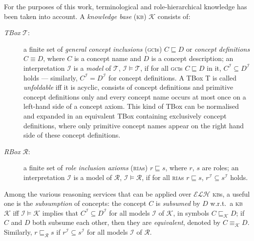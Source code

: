 \documentclass[]{llncs}
\newcommand{\elh}{\(\mathcal{ELH}{}\)}
\newcommand{\kb}{\textsc{kb}}
\newcommand{\ria}{\textsc{ria}}
\newcommand{\gci}{\textsc{gci}}
\newcommand{\subsume}[1]{\sqsubseteq_{\mathcal{#1}}}
\begin{document}
  For the purposes of this work, terminological and role-hierarchical knowledge has been taken into account.
  A \emph{knowledge base} (\kb) \(\mathcal{K}\) consists of:
  \begin{description}
    \item[\emph{TBox} \(\mathcal{T}\):] a finite set of \emph{general concept inclusions} (\textsc{gci}s) \(C \sqsubseteq D\) or \emph{concept definitions} \(C \equiv D\), where \(C\) is a concept name and \(D\) is a concept description;
    an interpretation \(\mathcal{I}\) is a \emph{model} of \(\mathcal{T}\), \(\mathcal{I} \models \mathcal{T}\), if for all \gci{}s \(C \sqsubseteq D\) in it, \(C^\mathcal{I} \subseteq D^\mathcal{I}\) holds --- similarly, \(C^\mathcal{I} = D^\mathcal{I}\) for concept definitions.
  A TBox T is called \emph{unfoldable} iff it is acyclic, consists of concept definitions and primitive concept definitions only and every concept name occurs at most once on a left-hand side of a concept axiom.
    This kind of TBox can be normalised and expanded in an equivalent TBox containing exclusively concept definitions, where only primitive concept names appear on the right hand side of these concept definitions.
    \item[\emph{RBox} \(\mathcal{R}\):] a finite set of \emph{role inclusion axioms} (\ria{}s) \(r \sqsubseteq s\), where \(r\), \(s\) are roles; an interpretation \(\mathcal{I}\) is a model of \(\mathcal{R}\), \(\mathcal{I} \models \mathcal{R}\), if for all \ria{}s \(r \sqsubseteq s\), \(r^\mathcal{I} \subseteq s^\mathcal{I}\) holds.
  \end{description}

  Among the various reasoning services that can be applied over \elh{} \kb{}s, a useful one is the \emph{subsumption} of concepts: the concept \(C\) is \emph{subsumed} by \(D\) w.r.t.\ a \kb{} \(\mathcal{K}\) iff \(\mathcal{I} \models \mathcal{K}\) implies that \(C^\mathcal{I} \subseteq D^\mathcal{I}\) for all models \(\mathcal{I}\) of \(\mathcal{K}\), in symbols \(C \subsume{K} D\);
  if \(C\) and \(D\) both subsume each other, then they are \emph{equivalent}, denoted by \(C \equiv_{\mathcal{K}} D\).
  Similarly, \(r \subsume{R} s\) if \(r^\mathcal{I} \subseteq s^\mathcal{I}\) for all models \(\mathcal{I}\) of \(\mathcal{R}\).
\end{document}
